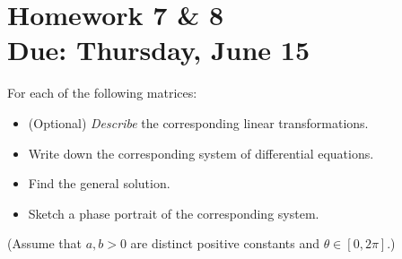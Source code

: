 


\usepackage{multicol}





\section*{Homework 7 \& 8\\ Due: Thursday, June 15}


For each of the following matrices:
\begin{itemize}
	\item (Optional) \emph{Describe} the corresponding linear transformations.

	\item Write down the corresponding system of differential equations.

	\item Find the general solution.

	\item Sketch a phase portrait of the corresponding system.
\end{itemize}
(Assume that $ a , b  > 0 $ are distinct positive constants and $ \theta \in [0,2 \pi ] $.)
\vspace{2em}

